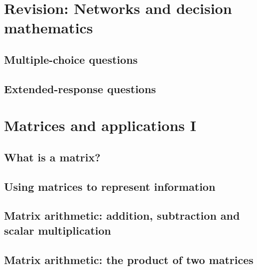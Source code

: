 \documentclass[a4paper,11pt]{article}
\begin{document}
\newpage

\section{Revision: Networks and decision mathematics}
\begin{outline}

\0
\subsection{Multiple-choice questions}

\0
\subsection{Extended-response questions}

\end{outline}

\newpage

\section{Matrices and applications I}
\begin{outline}

\0
\subsection{What is a matrix?}

\0
\subsection{Using matrices to represent information}

\0
\subsection{Matrix arithmetic: addition, subtraction and scalar multiplication}

\0
\subsection{Matrix arithmetic: the product of two matrices}

\end{outline}

\newpage
\end{document}
